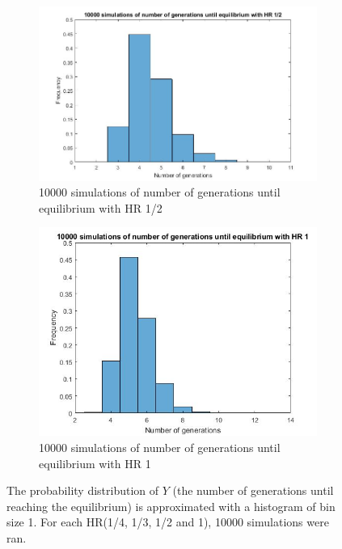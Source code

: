 \begin{figure}[H]
\begin{subfigure}{0.4\textwidth}
        \label{fig:tiger}
    \end{subfigure}
    ~ %
    \begin{subfigure}{0.4\textwidth}
        \includegraphics[width=\textwidth]{GenormHistogramAantalgen2}
        \caption{10000 simulations of number of generations until equilibrium with HR 1/2}
        \label{minimal happiness 1}
    \end{subfigure}
    \begin{subfigure}{0.4\textwidth}
        \includegraphics[width=\textwidth]{GenormHistogramAantalgen1}
        \caption{10000 simulations of number of generations until equilibrium with HR 1}
        \label{minimal happiness 2}
    \end{subfigure}
    \caption{The probability distribution of $Y$ (the number of generations until reaching the equilibrium) is approximated with a histogram of bin size 1. For each HR(1/4, 1/3, 1/2 and 1), 10000 simulations were ran.}\label{fig:histogram}
\end{figure}

